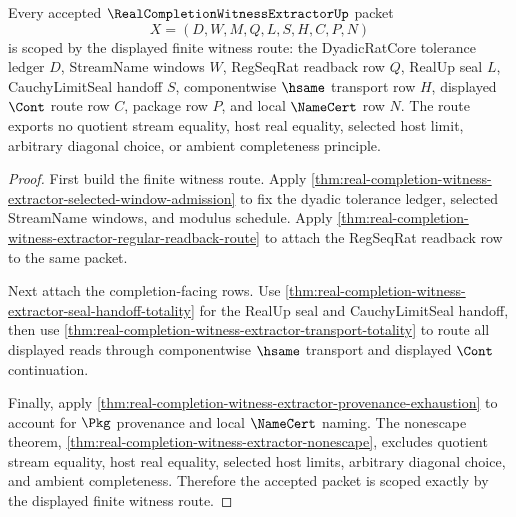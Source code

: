 \begin{theorem}
\label{thm:real-completion-witness-extractor-scoped-route}
Every accepted $\RealCompletionWitnessExtractorUp$ packet
$$
X=(D,W,M,Q,L,S,H,C,P,N)
$$
is scoped by the displayed finite witness route: the DyadicRatCore tolerance ledger $D$, StreamName windows $W$, RegSeqRat readback row $Q$, RealUp seal $L$, CauchyLimitSeal handoff $S$, componentwise $\hsame$ transport row $H$, displayed $\Cont$ route row $C$, package row $P$, and local $\NameCert$ row $N$. The route exports no quotient stream equality, host real equality, selected host limit, arbitrary diagonal choice, or ambient completeness principle.
\end{theorem}
\begin{proof}
First build the finite witness route. Apply \autoref{thm:real-completion-witness-extractor-selected-window-admission} to fix the dyadic tolerance ledger, selected StreamName windows, and modulus schedule. Apply \autoref{thm:real-completion-witness-extractor-regular-readback-route} to attach the RegSeqRat readback row to the same packet.

Next attach the completion-facing rows. Use \autoref{thm:real-completion-witness-extractor-seal-handoff-totality} for the RealUp seal and CauchyLimitSeal handoff, then use \autoref{thm:real-completion-witness-extractor-transport-totality} to route all displayed reads through componentwise $\hsame$ transport and displayed $\Cont$ continuation.

Finally, apply \autoref{thm:real-completion-witness-extractor-provenance-exhaustion} to account for $\Pkg$ provenance and local $\NameCert$ naming. The nonescape theorem, \autoref{thm:real-completion-witness-extractor-nonescape}, excludes quotient stream equality, host real equality, selected host limits, arbitrary diagonal choice, and ambient completeness. Therefore the accepted packet is scoped exactly by the displayed finite witness route.
\end{proof}

